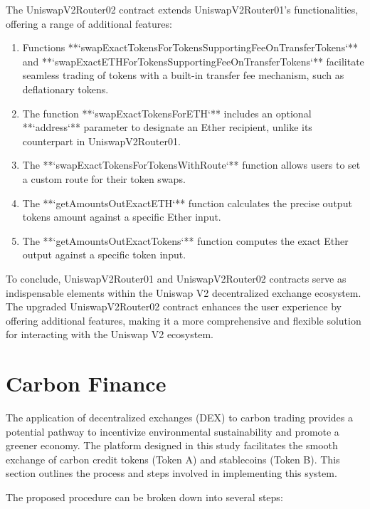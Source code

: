 \documentclass[sigconf, authordraft]{acmart}
\begin{document}
	The UniswapV2Router02 contract extends UniswapV2Router01's functionalities, offering
	a range of additional features:

	\begin{enumerate}
		\item Functions **`swapExactTokensForTokensSupportingFeeOnTransferTokens`** and
			**`swapExactETHForTokensSupportingFeeOnTransferTokens`** facilitate seamless
			trading of tokens with a built-in transfer fee mechanism, such as
			deflationary tokens.

		\item The function **`swapExactTokensForETH`** includes an optional **`address`**
			parameter to designate an Ether recipient, unlike its counterpart in
			UniswapV2Router01.

		\item The **`swapExactTokensForTokensWithRoute`** function allows users to set
			a custom route for their token swaps.

		\item The **`getAmountsOutExactETH`** function calculates the precise output
			tokens amount against a specific Ether input.

		\item The **`getAmountsOutExactTokens`** function computes the exact Ether output
			against a specific token input.
	\end{enumerate}

	To conclude, UniswapV2Router01 and UniswapV2Router02 contracts serve as indispensable
	elements within the Uniswap V2 decentralized exchange ecosystem. The upgraded
	UniswapV2Router02 contract enhances the user experience by offering additional
	features, making it a more comprehensive and flexible solution for interacting
	with the Uniswap V2 ecosystem.

	\section{Carbon Finance}


	The application of decentralized exchanges (DEX) to carbon trading provides a potential
	pathway to incentivize environmental sustainability and promote a greener economy.
	The platform designed in this study facilitates the smooth exchange of carbon
	credit tokens (Token A) and stablecoins (Token B). This section outlines the process
	and steps involved in implementing this system.

	The proposed procedure can be broken down into several steps:
\end{document}

